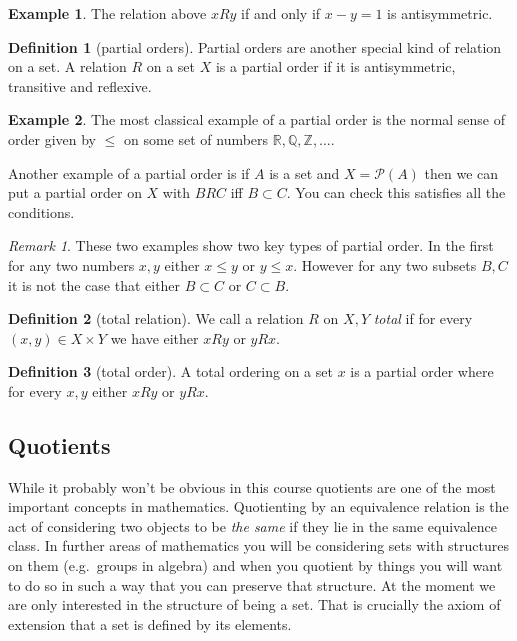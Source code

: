 \documentclass[
]{book}
\theoremstyle{definition}
\newtheorem{definition}{Definition}[chapter]
\theoremstyle{definition}
\newtheorem{example}{Example}[chapter]
\theoremstyle{definition}
\theoremstyle{definition}
\theoremstyle{remark}
\newtheorem*{remark}{Remark}
\begin{document}
\begin{example}
The relation above \(x R y\) if and only if \(x-y=1\) is antisymmetric.
\end{example}

\begin{definition}[partial orders]
Partial orders are another special kind of relation on a set. A relation \(R\) on a set \(X\) is a partial order if it is antisymmetric, transitive and reflexive.
\end{definition}

\begin{example}
The most classical example of a partial order is the normal sense of order given by \(\leq\) on some set of numbers \(\mathbb{R}, \mathbb{Q}, \mathbb{Z}, \dots\).

Another example of a partial order is if \(A\) is a set and \(X = \mathcal{P}(A)\) then we can put a partial order on \(X\) with \(B R C\) iff \(B \subset C\). You can check this satisfies all the conditions.
\end{example}

\begin{remark}
These two examples show two key types of partial order. In the first for any two numbers \(x,y\) either \(x \leq y\) or \(y \leq x\). However for any two subsets \(B, C\) it is not the case that either \(B \subset C\) or \(C \subset B\).
\end{remark}

\begin{definition}[total relation]
We call a relation \(R\) on \(X,Y\) \emph{total} if for every \((x,y) \in X \times Y\) we have either \(xRy\) or \(yRx\).
\end{definition}

\begin{definition}[total order]
A total ordering on a set \(x\) is a partial order where for every \(x,y\) either \(xRy\) or \(yRx\).
\end{definition}

\subsection{Quotients}\label{quotients}

While it probably won't be obvious in this course quotients are one of the most important concepts in mathematics. Quotienting by an equivalence relation is the act of considering two objects to be \emph{the same} if they lie in the same equivalence class. In further areas of mathematics you will be considering sets with structures on them (e.g.~groups in algebra) and when you quotient by things you will want to do so in such a way that you can preserve that structure. At the moment we are only interested in the structure of being a set. That is crucially the axiom of extension that a set is defined by its elements.
\end{document}
